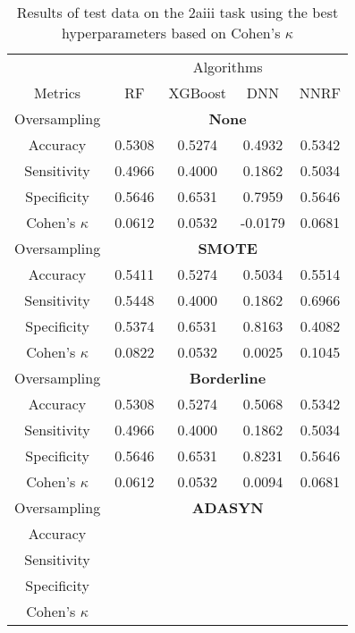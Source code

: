 \begin{table}[!htb]
\centering
\caption{Results of test data on the 2aiii task using the best hyperparameters based on Cohen's $\kappa$}
\label{tab:2aiii_test_results}
\begin{tabular}{c | c c c c}
\hline
 & \multicolumn{4}{c}{Algorithms}\\ 
Metrics &RF & XGBoost & DNN & NNRF\\ 
\hline
Oversampling &\multicolumn{4}{|c}{\textbf{None}}\\ 
\hline
Accuracy & 0.5308 & 0.5274 & 0.4932 & 0.5342\\ 
Sensitivity & 0.4966 & 0.4000 & 0.1862 & 0.5034\\ 
Specificity & 0.5646 & 0.6531 & 0.7959 & 0.5646\\ 
Cohen's $\kappa$ & 0.0612 & 0.0532 & -0.0179 & 0.0681\\ 
\hline
Oversampling &\multicolumn{4}{|c}{\textbf{SMOTE}}\\ 
\hline
Accuracy & 0.5411 & 0.5274 & 0.5034 & 0.5514\\ 
Sensitivity & 0.5448 & 0.4000 & 0.1862 & 0.6966\\ 
Specificity & 0.5374 & 0.6531 & 0.8163 & 0.4082\\ 
Cohen's $\kappa$ & 0.0822 & 0.0532 & 0.0025 & 0.1045\\ 
\hline
Oversampling &\multicolumn{4}{|c}{\textbf{Borderline}}\\ 
\hline
Accuracy & 0.5308 & 0.5274 & 0.5068 & 0.5342\\ 
Sensitivity & 0.4966 & 0.4000 & 0.1862 & 0.5034\\ 
Specificity & 0.5646 & 0.6531 & 0.8231 & 0.5646\\ 
Cohen's $\kappa$ & 0.0612 & 0.0532 & 0.0094 & 0.0681\\ 
\hline
Oversampling &\multicolumn{4}{|c}{\textbf{ADASYN}}\\ 
\hline
Accuracy &  &  &  & \\ 
Sensitivity &  &  &  & \\ 
Specificity &  &  &  & \\ 
Cohen's $\kappa$ &  &  &  & \\ 
\hline
\end{tabular}
\end{table}

